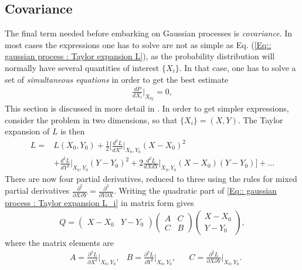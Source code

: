 \documentclass[twoside,english]{uiofysmaster}
\begin{document}
\subsection{Covariance}

The final term needed before embarking on Gaussian processes is \textit{covariance}. In most cases the expressions one has to solve are not as simple as Eq. (\ref{Eq:: gaussian process : Taylor expansion L}), as the probability distribution will normally have several quantities of interest $\{ X_i \}$. In that case, one has to solve a set of \textit{simultaneous equations} in order to get the best estimate
\begin{align}\label{Eq:: gaussian process : Best estimate X_i}
\frac{dP}{dX_i} \Big|_{X_{0j}} =0,
\end{align}
This section is discussed in more detail in \cite{sivia2006data}. In order to get simpler expressions, consider the problem in two dimensions, so that $\{ X_i \} = (X, Y)$. The Taylor expansion of $L$ is then
\begin{align}\label{Eq:: gaussian process : Taylor expansion L_i}
L =& L(X_0, Y_0) + \frac{1}{2} \Big[ \frac{d^2L}{dX^2}  \Big|_{X_0, Y_0}(X-X_0)^2 \nonumber \\
& + \frac{d^2L}{dY^2}  \Big|_{X_0, Y_0}(Y-Y_0)^2 + 2 \frac{d^2L}{dXdY}  \Big|_{X_0, Y_0}(X-X_0)(Y-Y_0) \Big] +...
\end{align}
There are now four partial derivatives, reduced to three using the rules for mixed partial derivatives $\frac{\partial^2}{\partial X \partial Y} = \frac{\partial^2}{\partial Y \partial X}$. Writing the quadratic part of \ref{Eq:: gaussian process : Taylor expansion L_i} in matrix form gives
\begin{align}
Q = 
\begin{pmatrix}
X-X_0 & Y -Y_0
\end{pmatrix}
\begin{pmatrix}
A & C\\
C & B
\end{pmatrix}
\begin{pmatrix}
X -X_0\\
Y-Y_0
\end{pmatrix},
\end{align}
where the matrix elements are
\begin{align}
&A = \frac{\partial^2 L}{\partial X^2} \Big|_{X_0, Y_0}, &B = \frac{\partial^2 L}{\partial Y^2} \Big|_{X_0, Y_0}, &&C = \frac{\partial^2 L}{\partial X \partial Y} \Big|_{X_0, Y_0}.
\end{align}
\end{document}
